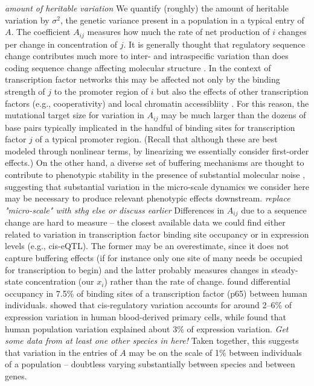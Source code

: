 \documentclass{article}
\newcommand{\plr}[1]{{\color{blue}\it #1}}
\newcommand{\1}{\mathbbm{1}}
\begin{document}
  \plr{amount of heritable variation}
  We quantify (roughly) the amount of heritable variation
  by $\sigma^2$, the genetic variance present in a population in a typical entry of $A$.
  The coefficient $A_{ij}$ measures how much the rate of net production of $i$ changes
  per change in concentration of $j$.
  It is generally thought that regulatory sequence change contributes much more to inter- and intraspecific variation
  than does coding sequence change affecting molecular structure \citep{schmidt2010vertebrate}.
  In the context of transcription factor networks this may be affected 
  not only by the binding strength of $j$ to the promoter region of $i$
  but also the effects of other transcription factors (e.g., cooperativity)
  and local chromatin accessibliity \citep{stefflova2013cooperativity}.
  For this reason, 
  the mutational target size for variation in $A_{ij}$ may be much larger than the dozens of base pairs
  typically implicated in the handful of binding sites for transcription factor $j$ of a typical promoter region.
  (Recall that although these are best modeled through nonlinear terms,
  by linearizing we essentially consider first-order effects.)
  On the other hand, a diverse set of buffering mechanisms are thought to contribute to phenotypic stability
  in the presence of substantial molecular noise \citep{canalization,buffering},
  suggesting that substantial variation in the micro-scale dynamics we consider here
  may be necessary to produce relevant phenotypic effects downstream.
  \plr{replace "micro-scale" with sthg else or discuss earlier}
  Differences in $A_{ij}$ due to a sequence change are hard to measure 
  -- the closest available data we could find either related to variation in transcription factor binding site occupancy
  or in expression levels (e.g., cis-eQTL).
  The former may be an overestimate, 
  since it does not capture buffering effects (if for instance only one site of many needs be occupied for transcription to begin)
  and the latter probably measures changes in steady-state concentration (our $x_i$) rather than the rate of change.
  \citet{kasowski2010variation} found differential occupancy in 7.5\%
  of binding sites of a transcription factor (p65) between human individuals.
  \citet{verlaan2009targeted} showed that cis-regulatory variation
  accounts for around 2--6\% of expression variation in human blood-derived primary cells,
  while \citep{lappalainen2013transcriptome} found that human population variation 
  explained about 3\% of expression variation.
  \plr{Get some data from at least one other species in here!}
  Taken together, this suggests that variation in the entries of $A$
  may be on the scale of 1\% between individuals of a population --
  doubtless varying substantially between species and between genes.
\end{document}
